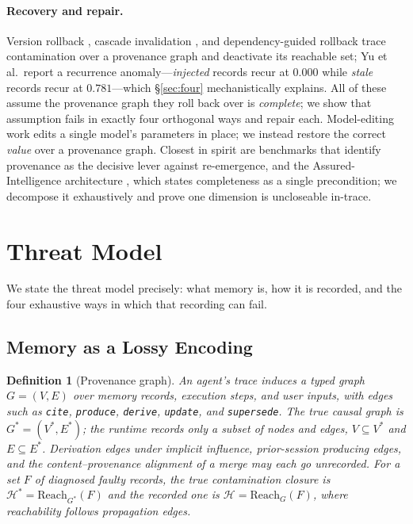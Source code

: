 \documentclass[11pt]{article}
\newtheorem{definition}{Definition}
\theoremstyle{remark}
\begin{document}
\paragraph{Recovery and repair.} Version rollback \citep{su2026chronomem,zheng2026acrfence},
cascade invalidation
\citep{zhao2026memorepair}, and dependency-guided rollback \citep{yu2026dependency} trace
contamination over a provenance graph and deactivate its reachable set; Yu et al.\ report a
recurrence anomaly---\emph{injected} records recur at $0.000$ while \emph{stale} records recur
at $0.781$---which \S\ref{sec:four} mechanistically explains. All of these assume the provenance
graph they roll back over is \emph{complete}; we show that assumption fails in exactly four
orthogonal ways and repair each. Model-editing work \citep{meng2022rome,mitchell2022mend}
edits a single model's parameters in place; we instead restore the correct \emph{value} over a
provenance graph. Closest in spirit are benchmarks
\citep{memsecbench2026,purgebench2026,wu2024longmemeval} that identify provenance as the
decisive lever against re-emergence, and the Assured-Intelligence architecture
\citep{assuredintelligence2026}, which states completeness as a single precondition; we
decompose it exhaustively and prove one dimension is uncloseable in-trace.

\section{Threat Model}
\label{sec:threat}

We state the threat model precisely: what memory is, how it is recorded, and the four
exhaustive ways in which that recording can fail.

\subsection{Memory as a Lossy Encoding}
\label{sec:formulation}

\begin{definition}[Provenance graph]
An agent's trace induces a typed graph $G=(V,E)$ over memory records, execution
steps, and user inputs, with edges such as \texttt{cite}, \texttt{produce},
\texttt{derive}, \texttt{update}, and \texttt{supersede}. The true causal graph is
$G^{*}=(V^{*},E^{*})$; the runtime records only a subset of nodes and edges, $V\subseteq V^{*}$ and $E\subseteq E^{*}$.
Derivation edges under implicit influence, prior-session producing edges, and the
content--provenance alignment of a merge may each go unrecorded. For a set $F$ of
diagnosed faulty records, the true contamination closure is $\mathcal{H}^{*} =
\mathrm{Reach}_{G^{*}}(F)$ and the recorded one is $\mathcal{H} =
\mathrm{Reach}_{G}(F)$, where reachability follows propagation edges.
\end{definition}
\end{document}
